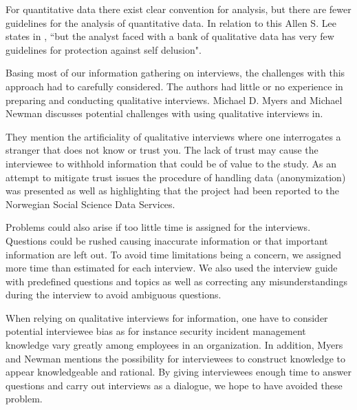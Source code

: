For quantitative data there exist clear convention for analysis, but there are fewer guidelines for the analysis of quantitative data. In relation to this Allen S. Lee states in \cite{lee1989scientific}, ``but the analyst faced with a bank of qualitative data has very few guidelines for protection against self delusion".

Basing most of our information gathering on interviews, the challenges with this approach had to carefully considered. The authors had little or no experience in preparing and conducting qualitative interviews. Michael D. Myers and Michael Newman discusses potential challenges with using qualitative interviews in\cite{myers2007qualitative}. 

They mention the artificiality of qualitative interviews where one interrogates a stranger that does not know or trust you. The lack of trust may cause the interviewee to withhold information that could be of value to the study. As an attempt to mitigate trust issues the procedure of handling data (anonymization) was presented as well as highlighting that the project had been reported to the Norwegian Social Science Data Services.   

Problems could also arise if too little time is assigned for the interviews. Questions could be rushed causing inaccurate information or that important information are left out. To avoid time limitations being a concern, we assigned more time than estimated for each interview. We also used the interview guide with predefined questions and topics as well as correcting any misunderstandings during the interview to avoid ambiguous questions.

When relying on qualitative interviews for information, one have to consider potential interviewee bias as for instance security incident management knowledge vary greatly among employees in an organization. In addition, Myers and Newman mentions the possibility for interviewees to construct knowledge to appear knowledgeable and rational. By giving interviewees enough time to answer questions and carry out interviews as a dialogue, we hope to have avoided these problem.




